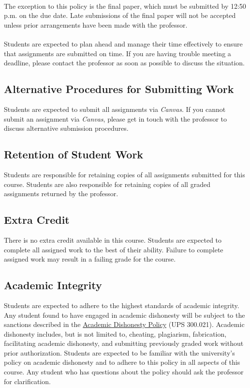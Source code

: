 \documentclass[11pt, letterpaper]{article}
\begin{document}
\paragraph{} The exception to this policy is the final paper, which must be submitted by 12:50 p.m. on the due date. Late submissions of the final paper will not be accepted unless prior arrangements have been made with the professor.

\paragraph{}Students are expected to plan ahead and manage their time effectively to ensure that assignments are submitted on time. If you are having trouble meeting a deadline, please contact the professor as soon as possible to discuss the situation.

\subsection*{Alternative Procedures for Submitting Work}
Students are expected to submit all assignments via \emph{Canvas}. If you cannot submit an assignment via \emph{Canvas}, please get in touch with the professor to discuss alternative submission procedures.

\subsection*{Retention of Student Work}
Students are responsible for retaining copies of all assignments submitted for this course. Students are also responsible for retaining copies of all graded assignments returned by the professor.

\subsection*{Extra Credit}
There is no extra credit available in this course. Students are expected to complete all assigned work to the best of their ability. Failure to complete assigned work may result in a failing grade for the course.

\subsection*{Academic Integrity}
Students are expected to adhere to the highest standards of academic integrity. Any student found to have engaged in academic dishonesty will be subject to the sanctions described in the \href{https://www.fullerton.edu/senate/publications_policies_resolutions/ups/UPS%20300/UPS%20300.021.pdf}{Academic Dishonesty Policy} (UPS 300.021). Academic dishonesty includes, but is not limited to, cheating, plagiarism, fabrication, facilitating academic dishonesty, and submitting previously graded work without prior authorization. Students are expected to be familiar with the university's policy on academic dishonesty and to adhere to this policy in all aspects of this course. Any student who has questions about the policy should ask the professor for clarification.
\end{document}
